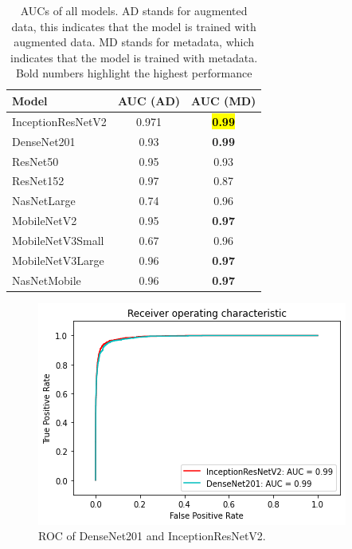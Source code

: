 \documentclass[sensors,article,accept,pdftex,moreauthors]{Definitions/mdpi}
\begin{document}
	\begin{table}[H]
			\caption{AUCs of all models. AD stands for augmented data, this indicates that the model is trained with augmented data. MD stands for metadata, which indicates that the model is trained with metadata. Bold numbers highlight the highest performance}
		\label{table:overall-auc}
	\setlength{\tabcolsep}{12.3mm}\begin{tabular}{ l  c  c  }
\toprule
\textbf{Model} & \textbf{AUC (AD)} & \textbf{AUC (MD)}\\ 
\midrule
InceptionResNetV2 & 0.971 & \textbf{\hl{0.99} %
}\\
\midrule
DenseNet201 & 0.93 & \textbf{0.99}\\
\midrule
ResNet50 & 0.95 & 0.93 \\
\midrule
ResNet152 & 0.97 & 0.87\\
\midrule
NasNetLarge & 0.74 & 0.96\\
\midrule
MobileNetV2 & 0.95 & \textbf{0.97}\\
\midrule
MobileNetV3Small & 0.67 & 0.96\\
\midrule
MobileNetV3Large & 0.96 & \textbf{0.97}\\
\midrule
NasNetMobile & 0.96 & \textbf{0.97}\\
\bottomrule
		\end{tabular}
	\end{table}\unskip
	
	\begin{figure}[H]
		\centering
		\includegraphics[width=1\linewidth]{Definitions/ROC/denvsirv2}
		\caption{ROC of DenseNet201 and InceptionResNetV2.}\label{fig:densevsirv2}
	\end{figure}
			
\end{document}
